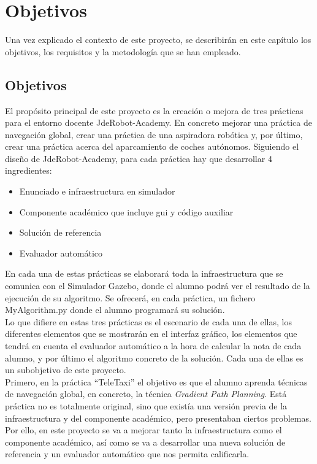 \chapter{Objetivos}\label{cap.objetivos}
Una vez explicado el contexto de este proyecto, se describirán en este capítulo los objetivos, los requisitos y la metodología que se han empleado.\\

\section{Objetivos}

El propósito principal de este proyecto es la creación o mejora de tres prácticas para el entorno docente JdeRobot-Academy. En concreto mejorar una práctica de navegación global, crear una práctica de una aspiradora robótica y, por último, crear una práctica acerca del aparcamiento de coches autónomos. Siguiendo el diseño de JdeRobot-Academy, para cada práctica hay que desarrollar 4 ingredientes:

\begin{itemize}
\item Enunciado e infraestructura en simulador
\item Componente académico que incluye \acrshort{gui} y código auxiliar
\item Solución de referencia
\item Evaluador automático
\end{itemize}

En cada una de estas prácticas se elaborará toda la infraestructura que se comunica con el Simulador Gazebo, donde el alumno podrá ver el resultado de la ejecución de su algoritmo. Se ofrecerá, en cada práctica, un fichero MyAlgorithm.py donde el alumno programará su solución.\\

Lo que difiere en estas tres prácticas es el escenario de cada una de ellas, los diferentes elementos que se mostrarán en el interfaz gráfico, los elementos que tendrá en cuenta el evaluador automático a la hora de calcular la nota de cada alumno, y por último el algoritmo concreto de la solución. Cada una de ellas es un subobjetivo de este proyecto.\\

Primero, en la práctica ``TeleTaxi'' el objetivo es que el alumno aprenda técnicas de navegación global, en concreto, la técnica \textit{Gradient Path Planning}. Está práctica no es totalmente original, sino que existía una versión previa de la infraestructura y del componente académico, pero presentaban ciertos problemas. Por ello, en este proyecto se va a mejorar tanto la infraestructura como el componente académico, así como se va a desarrollar una nueva solución de referencia y un evaluador automático que nos permita calificarla.\\

